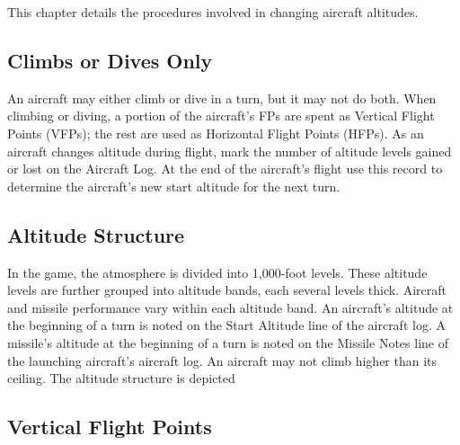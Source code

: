
\label{rule:changing-aircraft-altitude}


This chapter details the procedures involved in changing aircraft altitudes.

\subsection{Climbs or Dives Only}
An aircraft may either climb or dive in a turn, but it may not do both.  When climbing or diving, a portion of the aircraft's FPs are spent as Vertical Flight Points (VFPs); the rest are used as Horizontal Flight Points (HFPs). As an aircraft changes altitude during flight, mark the number of altitude levels gained or lost on the Aircraft Log. At the end of the aircraft's flight use this record to determine the aircraft's new start altitude for the next turn.

\subsection{Altitude Structure} In the game, the atmosphere is divided into 1,000-foot levels. These altitude levels are further grouped into altitude bands, each several levels thick. Aircraft and missile performance vary within each altitude band. An aircraft's altitude at the beginning of a turn is noted on the Start Altitude line of the aircraft log. A missile's altitude at the beginning of a turn is noted on the Missile Notes line of the launching aircraft's aircraft log. An aircraft may not climb higher than its ceiling. The altitude structure is depicted 

\subsection{Vertical Flight Points}

